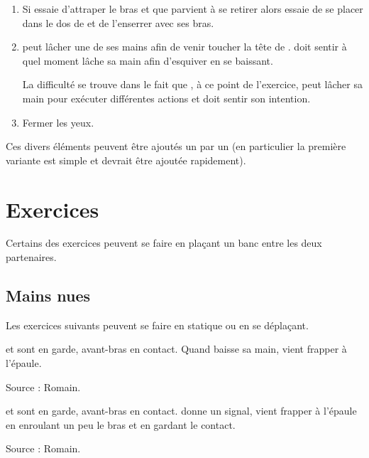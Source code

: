 \begin{exercice}
\begin{enumerate}
	\item Si \A essaie d'attraper le bras et que \D parvient à se retirer alors \D essaie de se placer dans le dos de \A et de l'enserrer avec ses bras.
	
	\item \A peut lâcher une de ses mains afin de venir toucher la tête de \D.
	\D doit sentir à quel moment \A lâche sa main afin d'esquiver en se baissant.
	
	La difficulté se trouve dans le fait que \A, à ce point de l'exercice, \A peut lâcher sa main pour exécuter différentes actions et \D doit sentir son intention.
	
	\item Fermer les yeux.
\end{enumerate}
Ces divers éléments peuvent être ajoutés un par un (en particulier la première variante est simple et devrait être ajoutée rapidement).

\end{exercice}


\section{Exercices}


Certains des exercices peuvent se faire en plaçant un banc entre les deux partenaires.


\subsection{Mains nues}


Les exercices suivants peuvent se faire en statique ou en se déplaçant.


\begin{exercice}
\label{struct:ex:contact:frappe-signal}

\A et \D sont en garde, avant-bras en contact.
Quand \A baisse sa main, \D vient frapper à l'épaule.

Source : Romain.

\end{exercice}


\begin{exercice}

\A et \D sont en garde, avant-bras en contact.
\A donne un signal, \D vient frapper à l'épaule en enroulant un peu le bras et en gardant le contact.

Source : Romain.

\end{exercice}


